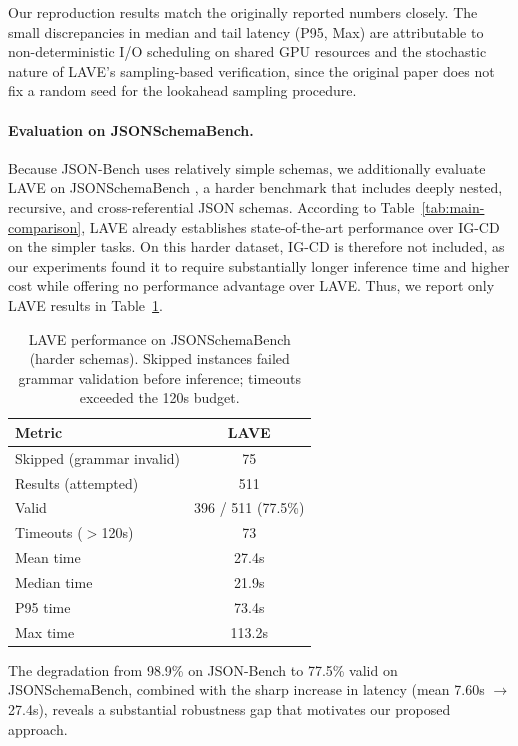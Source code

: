 Our reproduction results match the originally reported numbers closely. The small discrepancies in median and tail latency (P95, Max) are attributable to non-deterministic I/O scheduling on shared GPU resources and the stochastic nature of LAVE’s sampling-based verification, since the original paper does not fix a random seed for the lookahead sampling procedure.

\paragraph{Evaluation on JSONSchemaBench.}
Because JSON-Bench uses relatively simple schemas, we additionally evaluate LAVE on JSONSchemaBench \citep{geng2025jsonschemabenchrigorousbenchmarkstructured}, a harder benchmark that includes deeply nested, recursive, and cross-referential JSON schemas. According to Table~\ref{tab:main-comparison}, LAVE already establishes state-of-the-art performance over IG-CD on the simpler tasks. On this harder dataset, IG-CD is therefore not included, as our experiments found it to require substantially longer inference time and higher cost while offering no performance advantage over LAVE. Thus, we report only LAVE results in Table~\ref{tab:jsonschemabench}.

\begin{table}[h]
\centering
\caption{LAVE performance on JSONSchemaBench (harder schemas). Skipped instances failed grammar validation before inference; timeouts exceeded the 120s budget.}
\label{tab:jsonschemabench}
\begin{tabular}{lc}
\hline
\textbf{Metric} & \textbf{LAVE} \\
\hline
Skipped (grammar invalid) & 75        \\
Results (attempted)       & 511       \\
Valid                     & 396 / 511 (77.5\%) \\
Timeouts ($>$120s)        & 73        \\
Mean time                 & 27.4s     \\
Median time               & 21.9s     \\
P95 time                  & 73.4s     \\
Max time                  & 113.2s    \\
\hline
\end{tabular}
\end{table}

The degradation from 98.9\% on JSON-Bench to 77.5\% valid on JSONSchemaBench, combined with the sharp increase in latency (mean 7.60s $\to$ 27.4s), reveals a substantial robustness gap that motivates our proposed approach.



